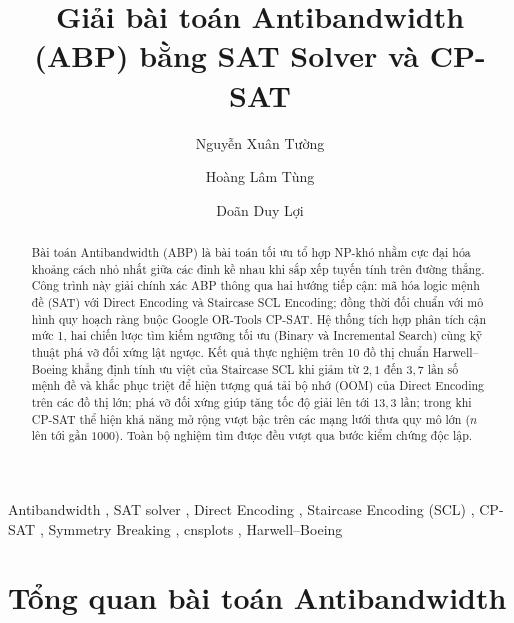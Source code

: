 \documentclass[a4paper,fleqn]{cas-sc}
\begin{document}
\let\WriteBookmarks\relax



\title[mode=title]{Giải bài toán Antibandwidth (ABP) bằng SAT Solver và CP-SAT}

\author{Nguyễn Xuân Tường}
\author{Hoàng Lâm Tùng}
\author{Doãn Duy Lợi}

\address{Khoa Công nghệ Thông tin, Trường Đại học Công nghệ, Đại học Quốc gia Hà Nội}

\begin{abstract}
Bài toán Antibandwidth (ABP) là bài toán tối ưu tổ hợp NP-khó nhằm cực đại hóa khoảng cách nhỏ nhất giữa các đỉnh kề nhau khi sắp xếp tuyến tính trên đường thẳng. Công trình này giải chính xác ABP thông qua hai hướng tiếp cận: mã hóa logic mệnh đề (SAT) với Direct Encoding và Staircase SCL Encoding; đồng thời đối chuẩn với mô hình quy hoạch ràng buộc Google OR-Tools CP-SAT. Hệ thống tích hợp phân tích cận mức 1, hai chiến lược tìm kiếm ngưỡng tối ưu (Binary và Incremental Search) cùng kỹ thuật phá vỡ đối xứng lật ngược. Kết quả thực nghiệm trên 10 đồ thị chuẩn Harwell--Boeing khẳng định tính ưu việt của Staircase SCL khi giảm từ $2{,}1$ đến $3{,}7$ lần số mệnh đề và khắc phục triệt để hiện tượng quá tải bộ nhớ (OOM) của Direct Encoding trên các đồ thị lớn; phá vỡ đối xứng giúp tăng tốc độ giải lên tới $13{,}3$ lần; trong khi CP-SAT thể hiện khả năng mở rộng vượt bậc trên các mạng lưới thưa quy mô lớn ($n$ lên tới gần $1000$). Toàn bộ nghiệm tìm được đều vượt qua bước kiểm chứng độc lập.
\end{abstract}

\begin{keywords}
Antibandwidth \sep
SAT solver \sep
Direct Encoding \sep
Staircase Encoding (SCL) \sep
CP-SAT \sep
Symmetry Breaking \sep
cnsplots \sep
Harwell--Boeing
\end{keywords}

\maketitle


\section{Tổng quan bài toán Antibandwidth}
\label{sec:overview}
\end{document}
